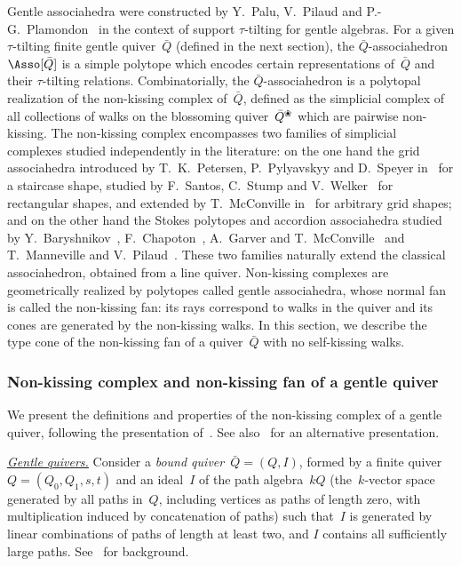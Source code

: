 \documentclass{amsart}
\theoremstyle{definition}
\newcommand{\darkblue}{\color{darkblue}} %
\newcommand{\defn}[1]{\textsl{\darkblue #1}} %
\newcommand{\para}[1]{\medskip\noindent\uline{\textit{#1.}}} %
\newcommand{\quiver}{\bar Q} %
\newcommand{\blossom}{^\text{\ding{96}}} %
\begin{document}
Gentle associahedra were constructed by Y.~Palu, V.~Pilaud and P.-G.~Plamondon~\cite{PaluPilaudPlamondon-nonkissing} in the context of support $\tau$-tilting for gentle algebras.
For a given $\tau$-tilting finite gentle quiver~$\quiver$ (defined in the next section), the $\quiver$-associahedron~$\Asso[\quiver]$ is a simple polytope which encodes certain representations of~$\quiver$ and their $\tau$-tilting relations.
Combinatorially, the $\quiver$-associahedron is a polytopal realization of the non-kissing complex of~$\quiver$, defined as the simplicial complex of all collections of walks on the blossoming quiver~$\quiver\blossom$ which are pairwise non-kissing.
The non-kissing complex encompasses two families of simplicial complexes studied independently in the literature: on the one hand the grid associahedra introduced by T.~K.~Petersen, P.~Pylyavskyy and D.~Speyer in~\cite{PetersenPylyavskyySpeyer} for a staircase shape, studied by F.~Santos, C.~Stump and V.~Welker~\cite{SantosStumpWelker} for rectangular shapes, and extended by T.~McConville in~\cite{McConville} for arbitrary grid shapes; and on the other hand the Stokes polytopes and accordion associahedra studied by Y.~Baryshnikov~\cite{Baryshnikov}, F.~Chapoton~\cite{Chapoton-quadrangulations}, A.~Garver and T.~McConville~\cite{GarverMcConville} and T.~Manneville and V.~Pilaud~\cite{MannevillePilaud-accordion}.
These two families naturally extend the classical associahedron, obtained from a line quiver.
Non-kissing complexes are geometrically realized by polytopes called gentle associahedra, whose normal fan is called the non-kissing fan: its rays correspond to walks in the quiver and its cones are generated by the non-kissing walks.
In this section, we describe the type cone of the non-kissing fan of a quiver~$\quiver$ with no self-kissing walks.


\subsubsection{Non-kissing complex and non-kissing fan of a gentle quiver}
\label{subsubsec:nonkissingComplex}

We present the definitions and properties of the non-kissing complex of a gentle quiver, following the presentation of~\cite{PaluPilaudPlamondon-nonkissing}.
See also~\cite{BrustleDouvilleMousavandThomasYildirim} for an alternative presentation.

\para{Gentle quivers}
%
Consider a \defn{bound quiver}~${\quiver = (Q,I)}$, formed by a finite quiver~$Q = (Q_0, Q_1, s, t)$ and an ideal~$I$ of the path algebra~$kQ$ (the~$k$-vector space generated by all paths in~$Q$, including vertices as paths of length zero, with multiplication induced by concatenation of paths) such that~$I$ is generated by linear combinations of paths of length at least two, and $I$ contains all sufficiently large paths. See~\cite{AssemSimsonSkowronski} for background.
\end{document}
